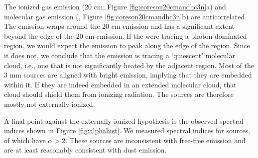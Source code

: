 \documentclass[twocolumn]{aastex61}
\begin{document}
The ionized gas emission (20 cm, Figure \ref{fig:coreson20cmandhc3n}a) and
molecular gas emission (\cyanoacetylene, Figure \ref{fig:coreson20cmandhc3n}b)
are anticorrelated.  The \cyanoacetylene emission wraps around the 20 cm
emission and has a significant extent beyond the edge of the 20 cm emission.
If the \cyanoacetylene were tracing a photon-dominated region, we would expect
the \cyanoacetylene emission to peak along the edge of the \hii region.
Since it does not, we conclude that the \cyanoacetylene emission is tracing a
`quiescent' molecular cloud, i.e., one that is not significantly heated by
the adjacent \hii region.  Most of the 3 mm sources are aligned with bright
\cyanoacetylene emission, implying that they are embedded within it.
If they are indeed embedded in an extended molecular cloud, that cloud
should shield them from ionizing radiation.  The sources are therefore
mostly not externally ionized.

A final point against the externally ionized hypothesis is the observed
spectral indices shown in Figure \ref{fig:alphahist}.  We measured spectral
indices for \nalphas sources, of which \ngttwo have $\alpha>2$.  These \ngttwo
sources are inconsistent with free-free emission and are at least reasonably
consistent with dust emission.



% 
% 
\end{document}
